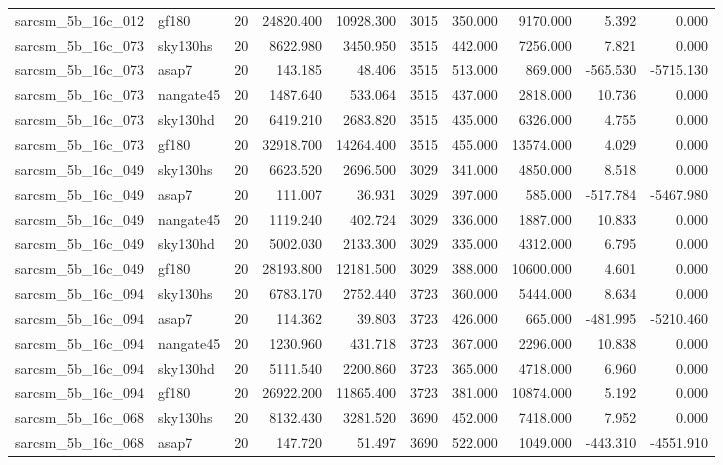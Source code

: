 \begin{longtable}{llrrrrrrrr}
sarcsm\_5b\_16c\_012 & gf180 & 20 & 24820.400 & 10928.300 & 3015 & 350.000 & 9170.000 & 5.392 & 0.000 \\
sarcsm\_5b\_16c\_073 & sky130hs & 20 & 8622.980 & 3450.950 & 3515 & 442.000 & 7256.000 & 7.821 & 0.000 \\
sarcsm\_5b\_16c\_073 & asap7 & 20 & 143.185 & 48.406 & 3515 & 513.000 & 869.000 & -565.530 & -5715.130 \\
sarcsm\_5b\_16c\_073 & nangate45 & 20 & 1487.640 & 533.064 & 3515 & 437.000 & 2818.000 & 10.736 & 0.000 \\
sarcsm\_5b\_16c\_073 & sky130hd & 20 & 6419.210 & 2683.820 & 3515 & 435.000 & 6326.000 & 4.755 & 0.000 \\
sarcsm\_5b\_16c\_073 & gf180 & 20 & 32918.700 & 14264.400 & 3515 & 455.000 & 13574.000 & 4.029 & 0.000 \\
sarcsm\_5b\_16c\_049 & sky130hs & 20 & 6623.520 & 2696.500 & 3029 & 341.000 & 4850.000 & 8.518 & 0.000 \\
sarcsm\_5b\_16c\_049 & asap7 & 20 & 111.007 & 36.931 & 3029 & 397.000 & 585.000 & -517.784 & -5467.980 \\
sarcsm\_5b\_16c\_049 & nangate45 & 20 & 1119.240 & 402.724 & 3029 & 336.000 & 1887.000 & 10.833 & 0.000 \\
sarcsm\_5b\_16c\_049 & sky130hd & 20 & 5002.030 & 2133.300 & 3029 & 335.000 & 4312.000 & 6.795 & 0.000 \\
sarcsm\_5b\_16c\_049 & gf180 & 20 & 28193.800 & 12181.500 & 3029 & 388.000 & 10600.000 & 4.601 & 0.000 \\
sarcsm\_5b\_16c\_094 & sky130hs & 20 & 6783.170 & 2752.440 & 3723 & 360.000 & 5444.000 & 8.634 & 0.000 \\
sarcsm\_5b\_16c\_094 & asap7 & 20 & 114.362 & 39.803 & 3723 & 426.000 & 665.000 & -481.995 & -5210.460 \\
sarcsm\_5b\_16c\_094 & nangate45 & 20 & 1230.960 & 431.718 & 3723 & 367.000 & 2296.000 & 10.838 & 0.000 \\
sarcsm\_5b\_16c\_094 & sky130hd & 20 & 5111.540 & 2200.860 & 3723 & 365.000 & 4718.000 & 6.960 & 0.000 \\
sarcsm\_5b\_16c\_094 & gf180 & 20 & 26922.200 & 11865.400 & 3723 & 381.000 & 10874.000 & 5.192 & 0.000 \\
sarcsm\_5b\_16c\_068 & sky130hs & 20 & 8132.430 & 3281.520 & 3690 & 452.000 & 7418.000 & 7.952 & 0.000 \\
sarcsm\_5b\_16c\_068 & asap7 & 20 & 147.720 & 51.497 & 3690 & 522.000 & 1049.000 & -443.310 & -4551.910 \\

\end{longtable}
